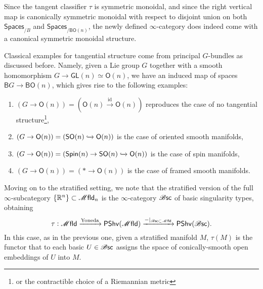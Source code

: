 \documentclass[../text]{subfiles}
\begin{document}
\begin{remark}
    Since the tangent classifier $\tau$ is symmetric monoidal, and since the right vertical map is canonically symmetric monoidal with respect to disjoint union on both $\mathsf{Spaces}_{/B}$ and $\mathsf{Spaces}_{/\mathsf{BO}(n)}$, the newly defined $\infty$-category does indeed come with a canonical symmetric monoidal structure.
\end{remark}

\begin{example}
    Classical examples for tangential structure come from principal $G$-bundles as discussed before. Namely, given a Lie group $G$ together with a smooth homomorphism $G \rightarrow \mathsf{GL}(n) \simeq \mathsf{O}(n)$, we have an induced map of spaces $\mathsf{B}G \rightarrow \mathsf{BO}(n)$, which gives rise to the following examples:
    \begin{enumerate}
        \item $(G \rightarrow \mathsf{O}(n)) = (\mathsf{O}(n) \xrightarrow{\mathrm{id}} \mathsf{O}(n))$ reproduces the case of no tangential structure\footnote{or the contractible choice of a Riemannian metric},
        \item $(G \rightarrow \mathsf{O}(n)) = (\mathsf{SO}(n) \xhookrightarrow{} \mathsf{O}(n))$ is the case of oriented smooth manifolds,
        \item $(G \rightarrow \mathsf{O}(n)) = (\mathsf{Spin}(n) \rightarrow \mathsf{SO}(n) \xhookrightarrow{} \mathsf{O}(n))$ is the case of spin manifolds,
        \item $(G \rightarrow \mathsf{O}(n)) = (* \rightarrow \mathsf{O}(n))$ is the case of framed smooth manifolds.
    \end{enumerate}
\end{example}

Moving on to the stratified setting, we note that the stratified version of the full $\infty$-subcategory $\{\mathbb{R}^n\} \subset \mfld_n$ is the $\infty$-category $\mathscr{B} \mathsf{sc}$ of basic singularity types, obtaining
%
\begin{equation}
    \tau: \mfld \xrightarrow{\mathrm{Yoneda}} \mathsf{PShv}(\mfld) \xrightarrow{-|_{\bsc \subset \mfld}} \mathsf{PShv}(\bsc).
\end{equation}
%
In this case, as in the previous one, given a stratified manifold $M$, $\tau(M)$ is the functor that to each basic $U \in \mathscr{B} \mathsf{sc}$ assigns the space of conically-smooth open embeddings of $U$ into $M$.
\end{document}

